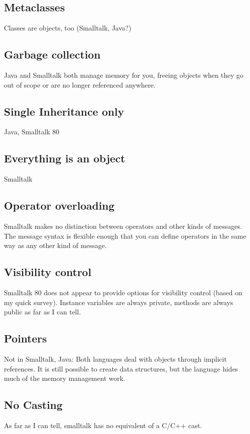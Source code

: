 \subsection{Metaclasses}
Classes are objects, too (Smalltalk, Java?)


\subsection{Garbage collection}
Java and Smalltalk both manage memory for you, freeing objects when they
go out of scope or are no longer referenced anywhere.


\subsection{Single Inheritance only}
Java, Smalltalk 80


\subsection{Everything is an object}
Smalltalk


\subsection{Operator overloading}
Smalltalk makes no distinction between operators and other kinds of
messages. The message syntax is flexible enough that you can define
operators in the same way as any other kind of message.


\subsection{Visibility control}
Smalltalk 80 does not appear to provide options for visibility control
(based on my quick survey). Instance variables are always private,
methods are always public as far as I can tell.


\subsection{Pointers}
Not in Smalltalk, Java: Both languages deal with objects through
implicit references. It is still possible to create data structures,
but the language hides much of the memory management work.


\subsection{No Casting}
As far as I can tell, smalltalk has no equivalent of a C/C++ cast.


